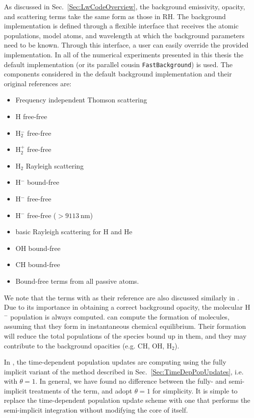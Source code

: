 As discussed in Sec.~\ref{Sec:LwCodeOverview}, the background emissivity, opacity, and scattering terms take the same form as those in RH.
The background implementation is defined through a flexible interface that receives the atomic populations, model atoms, and wavelength at which the background parameters need to be known.
Through this interface, a user can easily override the provided implementation.
In all of the numerical experiments presented in this thesis the default implementation (or its parallel cousin \texttt{FastBackground}) is used.
The components considered in the default background implementation and their original references are:
\begin{itemize}
    \itemsep-0.5em
    \item Frequency independent Thomson scattering \citep{Mihalas1978}
    \item H free-free \citep{Mihalas1978}
    \item H$_2^-$ free-free \citep{Bell1980}
    \item H$_2^+$ free-free \citep{Bates1952}
    \item H$_2$ Rayleigh scattering \citep{Victor1969,Tarafdar1973}
    \item H$^-$ bound-free \citep{Geltman1962,Mihalas1978}
    \item H$^-$ free-free \citep{Stilley1970,Mihalas1978}
    \item H$^-$ free-free ($>\SI{9113}{\nano\m}$) \citep{John1988}
    \item basic Rayleigh scattering for H and He \citep{Mihalas1978}
    \item OH bound-free \citep{Kurucz1987}
    \item CH bound-free \citep{Kurucz1987}
    \item Bound-free terms from all passive atoms.
\end{itemize}
We note that the terms with \citep{Mihalas1978} as their reference are also discussed similarly in \citet{Hubeny2014}.
Due to its importance in obtaining a correct background opacity, the molecular H$^-$ population is always computed.
\Lw{} can compute the formation of molecules, assuming that they form in instantaneous chemical equilibrium.
Their formation will reduce the total populations of the species bound up in them, and they may contribute to the background opacities (e.g. CH, OH, H$_2$).

In \Lw{}, the time-dependent population updates are computing using the fully implicit variant of the method described in Sec.~\ref{Sec:TimeDepPopUpdates}, i.e. with $\theta=1$.
In general, we have found no difference between the fully- and semi-implicit treatments of the term, and adopt $\theta=1$ for simplicity.
It is simple to replace the time-dependent population update scheme with one that performs the semi-implicit integration without modifying the core of \Lw{} itself.

